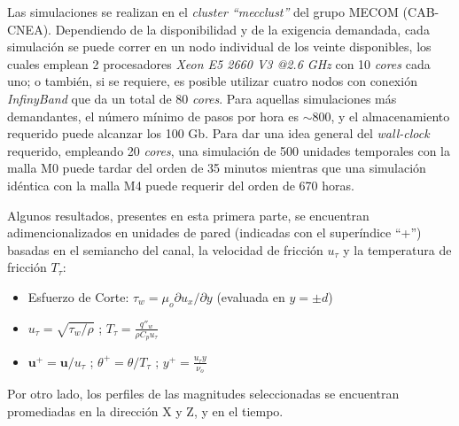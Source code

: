 Las simulaciones se realizan en el \textit{cluster ``mecclust''} del grupo MECOM (CAB-CNEA). Dependiendo de la disponibilidad y de la exigencia demandada, cada simulación se puede correr en un nodo individual de los veinte disponibles, los cuales emplean 2 procesadores \textit{Xeon E5 2660 V3 @2.6 GHz} con 10 \textit{cores} cada uno; o también, si se requiere, es posible utilizar cuatro nodos con conexión \textit{InfinyBand} que da un total de 80 \textit{cores}. Para aquellas simulaciones más demandantes, el número mínimo de pasos por hora es $\sim 800$, y el almacenamiento requerido puede alcanzar los 100 Gb. Para dar una idea general del \textit{wall-clock} requerido, empleando 20 \textit{cores}, una simulación de 500 unidades temporales con la malla M0 puede tardar del orden de 35 minutos mientras que una simulación idéntica con la malla M4 puede requerir del orden de 670 horas.       


\begin{table}[H]
\centering
{}
\caption{Distintas resoluciones espaciales y temporales utilizadas en las simulaciones de validación. Debido a que la discretización en la dirección $Y$ es no uniforme , se reporta el máximo $\Delta y$ asociado.}
\label{tab:meshes}
\end{table}

Algunos resultados, presentes en esta primera parte, se encuentran adimencionalizados en unidades de pared (indicadas con el superíndice ``+'') basadas en el semiancho del canal, la velocidad de fricción $u_{\tau}$ y la temperatura de fricción $T_{\tau}$:

\begin{itemize}
	\item Esfuerzo de Corte: $\tau_w= \mu_o \partial u_x / \partial y$ (evaluada en $y=\pm d$)  
	\item $u_{\tau} = \sqrt{\tau_w / \rho}$ ; $T_{\tau}=\frac{q''_w}{\rho C_p u_{\tau}}$
	\item $\mathbf{u}^+ = \mathbf{u} / u_{\tau}$ ; $\theta^+ = \theta / T_{\tau}$ ; $y^+ = \frac{u_{\tau} y}{\nu_o}$
\end{itemize}
Por otro lado, los perfiles de las magnitudes seleccionadas se encuentran promediadas en la dirección X y Z, y en el tiempo.

